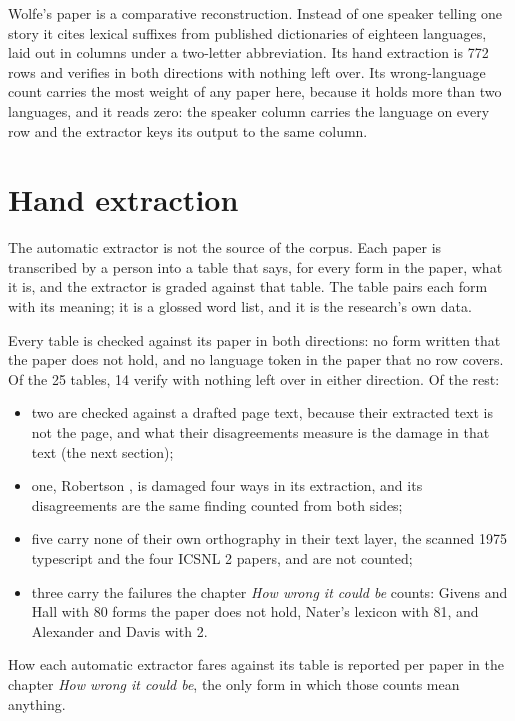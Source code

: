 Wolfe's paper \cite{src:Wolfe-2025} is a comparative reconstruction. Instead of one speaker telling one story it cites lexical suffixes from published dictionaries of eighteen languages, laid out in columns under a two-letter abbreviation. Its hand extraction is 772 rows and verifies in both directions with nothing left over. Its wrong-language count carries the most weight of any paper here, because it holds more than two languages, and it reads zero: the speaker column carries the language on every row and the extractor keys its output to the same column.

\section{Hand extraction}

The automatic extractor is not the source of the corpus. Each paper is transcribed by a person into a table that says, for every form in the paper, what it is, and the extractor is graded against that table. The table pairs each form with its meaning; it is a glossed word list, and it is the research's own data.

Every table is checked against its paper in both directions: no form written that the paper does not hold, and no language token in the paper that no row covers. Of the 25 tables, 14 verify with nothing left over in either direction. Of the rest:

\begin{itemize}
\item two are checked against a drafted page text, because their extracted text is not the page, and what their disagreements measure is the damage in that text (the next section);
\item one, Robertson \cite{src:Robertson-2012}, is damaged four ways in its extraction, and its disagreements are the same finding counted from both sides;
\item five carry none of their own orthography in their text layer, the scanned 1975 typescript and the four ICSNL 2 papers, and are not counted;
\item three carry the failures the chapter \emph{How wrong it could be} counts: Givens and Hall \cite{src:Givens-and-Hall-2023} with 80 forms the paper does not hold, Nater's lexicon \cite{src:Nater-2013} with 81, and Alexander and Davis \cite{src:Alexander-and-Davis-2026} with 2.
\end{itemize}

How each automatic extractor fares against its table is reported per paper in the chapter \emph{How wrong it could be}, the only form in which those counts mean anything.

